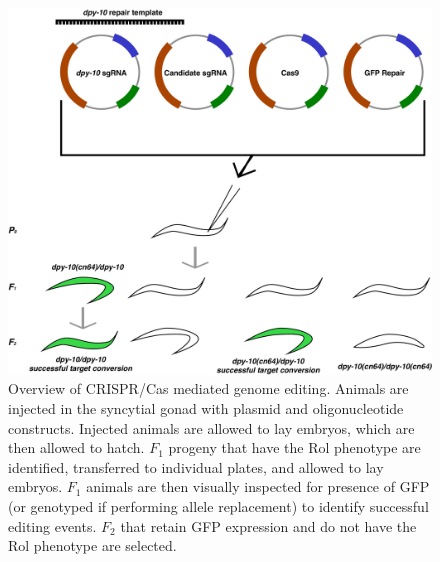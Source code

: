 \documentclass[12pt]{article}
\begin{document}
\newpage

\begin{figure}[h]
\renewcommand{\thefigure}{A.\arabic{figure}}
\centering
\includegraphics[scale=0.4]{Figures/Appendix_CRISPR.pdf}
\vspace{10pt}
\caption[Overview of CRISPR/Cas mediated genome editing]{Overview of CRISPR/Cas mediated genome editing. Animals are injected in the syncytial gonad with plasmid and oligonucleotide constructs. Injected animals are allowed to lay embryos, which are then allowed to hatch. $F_{1}$ progeny that have the Rol phenotype are identified, transferred to individual plates, and allowed to lay embryos. $F_{1}$ animals are then visually inspected for presence of GFP (or genotyped if performing allele replacement) to identify successful editing events. $F_{2}$ that retain GFP expression and do not have the Rol phenotype are selected.}
\label{CRISPR}
\end{figure}

\newpage
\end{document}
